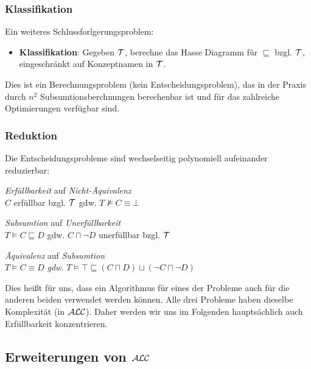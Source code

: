 \subsubsection{Klassifikation}

Ein weiteres Schlussforlgerungsproblem:

\begin{itemize}
  \item \textbf{Klassifikation}: Gegeben $\mathcal{T}$, berechne das Hasse Diagramm für $\sqsubseteq$ bzgl. $\mathcal{T}$, eingeschränkt auf Konzeptnamen in $\mathcal{T}$.
\end{itemize}

Dies ist ein Berechnungsproblem (kein Entscheidungsproblem), das in der Praxis durch $n^2$ Subsumtionsberchnungen berechenbar ist und für das zahlreiche Optimierungen verfügbar sind.

\subsubsection{Reduktion}

Die Entscheidungsprobleme sind wechselseitig polynomiell aufeinander reduzierbar:

\begin{lemma}
\begin{enumerate}
\item{\emph{Erfüllbarkeit} auf \emph{Nicht-Äquivalenz} \\
$C$ erfüllbar bzgl. $\mathcal{T}$ gdw. $T \not\vDash C \equiv \bot$}
\item{\emph{Subsumtion} auf \emph{Unerfüllbarkeit} \\
$T \vDash C \sqsubseteq D$ gdw. $C \sqcap \neg D$ unerfüllbar bzgl.
$\mathcal{T}$
\item{\emph{Äquivalenz} auf \emph{Subsumtion} \\}
$T \vDash C \equiv D$ \emph{gdw.} $T \vDash \top \sqsubseteq \left( C \sqcap D \right) \sqcup \left( \neg C \sqcap \neg D \right)$}
\end{enumerate}
\end{lemma}

Dies heißt für uns, dass ein Algorithmus für eines der Probleme auch für die anderen beiden verwendet werden können. Alle drei Probleme haben dieselbe Komplexität (in $\mathcal{A}\mathcal{L}\mathcal{C}$). Daher werden wir uns im Folgenden hauptsächlich auch Erfüllbarkeit konzentrieren.

\subsection{Erweiterungen von $\mathcal{A}\mathcal{L}\mathcal{C}$}\label{erweiterungen-von-alc}


